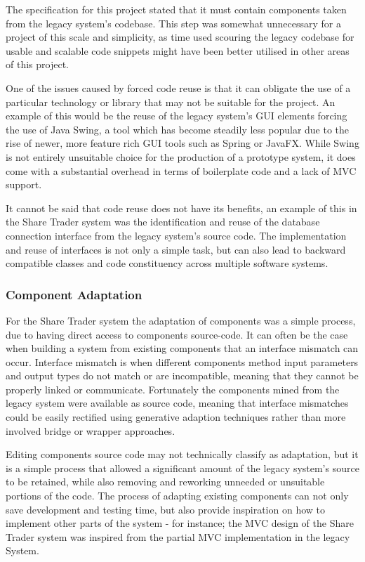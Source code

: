 \documentclass[12pt, a4paper,titlepage]{article}
\begin{document}
The specification for this project stated that it must contain components
taken from the legacy system’s codebase. 
This step was somewhat unnecessary for a project of this scale and simplicity,
as time used scouring the legacy codebase for usable and scalable code
snippets might have been better utilised in other areas of this project.

One of the issues caused by forced code reuse is that it can obligate the use
of a particular technology or library that may not be suitable for the
project. 
An example of this would be the reuse of the legacy system’s GUI elements
forcing the use of Java Swing, a tool which has become steadily less popular
due to the rise of newer, more feature rich GUI tools such as Spring or
JavaFX. 
While Swing is not entirely unsuitable choice for the production of a
prototype system, it does come with a substantial overhead in terms of
boilerplate code and a lack of MVC support.

It cannot be said that code reuse does not have its benefits, an example of
this in the Share Trader system was the identification and reuse of the
database connection interface from the legacy system’s source code. 
The implementation and reuse of interfaces is not only a simple task, but can
also lead to backward compatible classes and code constituency across multiple
software systems.

\subsubsection{Component Adaptation}
For the Share Trader system the adaptation of components was a simple process,
due to having direct access to components source-code. 
It can often be the case when building a system from existing components that
an interface mismatch can occur. 
Interface mismatch is when different components method input parameters and
output types do not match or are incompatible, meaning that they cannot be
properly linked or communicate.  
Fortunately the components mined from the legacy system were available as
source code, meaning that interface mismatches could be easily rectified
using generative adaption techniques rather than more involved bridge or
wrapper approaches.

Editing components source code may not technically classify as adaptation, but
it is a simple process that allowed a significant amount of the legacy system's
source to be retained, while also removing and reworking unneeded or
unsuitable portions of the code. 
The process of adapting existing components can not only save development and
testing time, but also provide inspiration on how to implement other parts of
the system - for instance; the MVC design of the Share Trader system was
inspired from the partial MVC implementation in the legacy System.
\end{document}
